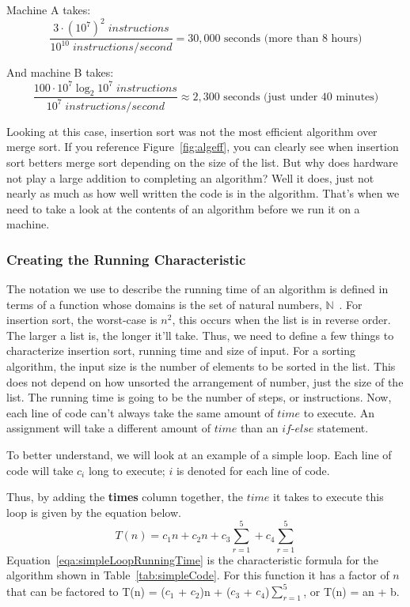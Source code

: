 \documentclass[12pt]{article}
\begin{document}
	Machine A takes:
	\begin{equation}
	\frac{3\cdot(10^7)^2 \;instructions}{10^{10} \;instructions/\!second}=30,000\mbox{ seconds (more than 8 hours)}
	\end{equation}
	
	And machine B takes:
	\begin{equation}	
	\frac{100\cdot 10^7\log_2{10^7}\;instructions}{10^{7} \;instructions/\!second}\approx2,300\mbox{ seconds (just under 40 minutes)}
	\end{equation}
	
	Looking at this case, insertion sort was not the most efficient algorithm over merge sort.
	If you reference Figure~\ref{fig:algeff}, you can clearly see when insertion sort betters merge sort depending on the size of the list.
	But why does hardware not play a large addition to completing an algorithm?
	Well it does, just not nearly as much as how well written the code is in the algorithm.
	That's when we need to take a look at the contents of an algorithm before we run it on a machine.
	
	\subsubsection{Creating the Running Characteristic}
	
	The notation we use to describe the running time of an algorithm is defined in terms of a function whose domains is the set of natural numbers, $\mathbb{N}$~\cite[p.~43]{intro}.
	For insertion sort, the worst-case is $n^2$, this occurs when the list is in reverse order.
	The larger a list is, the longer it'll take.
	Thus, we need to define a few things to characterize insertion sort, running time and size of input.
	For a sorting algorithm, the input size is the number of elements to be sorted in the list.
	This does not depend on how unsorted the arrangement of number, just the size of the list.
	The running time is going to be the number of steps, or instructions.
	Now, each line of code can't always take the same amount of $\textit{time}$ to execute.
	An assignment will take a different amount of $\textit{time}$ than an $\textit{if-else}$ statement.
	
	To better understand, we will look at an example of a simple loop.
	Each line of code will take $c_i$ long to execute; $i$ is denoted for each line of code.
	
	Thus, by adding the \textbf{times} column together, the $\textit{time}$ it takes to execute this loop is given by the equation below.
	\begin{equation}
	T(n) = c_1n + c_2n + c_3\sum_{r=1}^{5} + c_4\sum_{r=1}^{5}
	\label{eqa:simpleLoopRunningTime}
	\end{equation}
	Equation~\ref{eqa:simpleLoopRunningTime} is the characteristic formula for the algorithm shown in Table~\ref{tab:simpleCode}.
	For this function it has a factor of $n$ that can be factored to T(n) = ($c_1$ + $c_2$)n + ($c_3$ + $c_4$)$\sum_{r=1}^{5}$, or T(n) = an + b.
	
\end{document}

